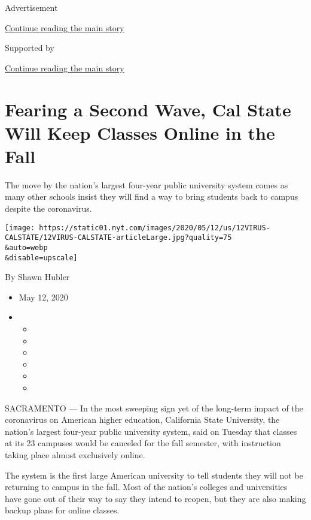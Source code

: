Advertisement

\protect\hyperlink{after-top}{Continue reading the main story}

Supported by

\protect\hyperlink{after-sponsor}{Continue reading the main story}

\hypertarget{fearing-a-second-wave-cal-state-will-keep-classes-online-in-the-fall}{%
\section{Fearing a Second Wave, Cal State Will Keep Classes Online in
the
Fall}\label{fearing-a-second-wave-cal-state-will-keep-classes-online-in-the-fall}}

The move by the nation's largest four-year public university system
comes as many other schools insist they will find a way to bring
students back to campus despite the coronavirus.

\texttt{[image: https://static01.nyt.com/images/2020/05/12/us/12VIRUS-CALSTATE/12VIRUS-CALSTATE-articleLarge.jpg?quality=75\\\&auto=webp\\\&disable=upscale]}

By Shawn Hubler

\begin{itemize}
\item
  May 12, 2020
\item
  \begin{itemize}
  \item
  \item
  \item
  \item
  \item
  \item
  \end{itemize}
\end{itemize}

SACRAMENTO --- In the most sweeping sign yet of the long-term impact of
the coronavirus on American higher education, California State
University, the nation's largest four-year public university system,
said on Tuesday that classes at its 23 campuses would be canceled for
the fall semester, with instruction taking place almost exclusively
online.

The system is the first large American university to tell students they
will not be returning to campus in the fall. Most of the nation's
colleges and universities have gone out of their way to say they intend
to reopen, but they are also making backup plans for online classes.

